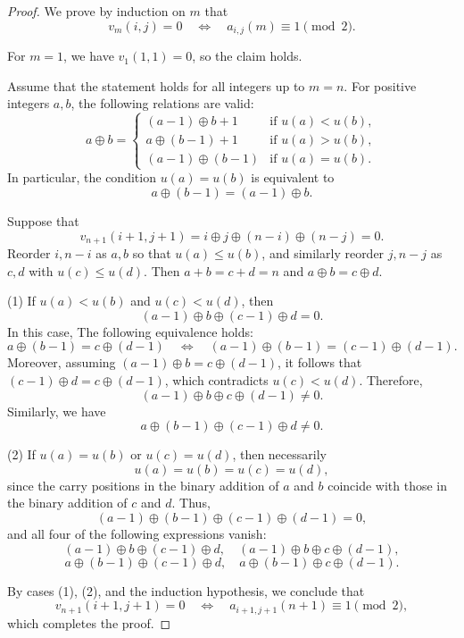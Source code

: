 \documentclass[10pt,a4paper]{amsart}
\begin{document}
\begin{proof}
We prove by induction on $m$ that
\[
v_m(i,j) = 0
\quad \Longleftrightarrow \quad
a_{i,j}(m) \equiv 1 \pmod{2}.
\]

For $m=1$, we have $v_1(1,1)=0$, so the claim holds.

Assume that the statement holds for all integers up to $m=n$.
For positive integers $a,b$, the following relations are valid:
\[
a \oplus b =
\begin{cases}
(a-1)\oplus b + 1 & \text{if } u(a) < u(b), \\
a \oplus (b-1) + 1 & \text{if } u(a) > u(b), \\
(a-1)\oplus (b-1) & \text{if } u(a) = u(b).
\end{cases}
\]
In particular, the condition $u(a)=u(b)$ is equivalent to
\[
a \oplus (b-1) = (a-1)\oplus b.
\]

Suppose that
\[
v_{n+1}(i+1,j+1)
= i \oplus j \oplus (n-i) \oplus (n-j) = 0.
\]
Reorder $i,n-i$ as $a,b$ so that $u(a) \le u(b)$, and similarly reorder $j,n-j$ as $c,d$ with $u(c) \le u(d)$.
Then $a+b=c+d=n$ and $a\oplus b=c\oplus d$.

\medskip
\noindent
(1) If \(u(a) < u(b)\) and \(u(c) < u(d)\), then
\[
(a-1)\oplus b \oplus (c-1)\oplus d = 0.
\]
In this case, The following equivalence holds:
\[
a\oplus(b-1)=c\oplus(d-1)
\quad \Longleftrightarrow \quad
(a-1)\oplus(b-1)=(c-1)\oplus(d-1).
\]
Moreover, assuming \((a-1) \oplus b = c \oplus (d-1)\), it follows that
\((c-1) \oplus d = c \oplus (d-1)\), which contradicts \(u(c) < u(d)\).
Therefore,
\[
(a-1) \oplus b \oplus c \oplus (d-1) \neq 0.
\]
Similarly, we have
\[
a \oplus (b-1) \oplus (c-1) \oplus d \neq 0.
\]


\medskip
\noindent
(2) If $u(a)=u(b)$ or $u(c)=u(d)$, then necessarily
\[
u(a)=u(b)=u(c)=u(d),
\]
since the carry positions in the binary addition of $a$ and $b$ coincide with those in the binary addition of $c$ and $d$.
Thus,
\[
(a-1)\oplus(b-1)\oplus(c-1)\oplus(d-1)=0,
\]
and all four of the following expressions vanish:
\[
(a-1)\oplus b \oplus (c-1)\oplus d,
\quad
(a-1)\oplus b \oplus c \oplus (d-1),
\]
\[
a\oplus(b-1)\oplus(c-1)\oplus d,
\quad
a\oplus(b-1)\oplus c \oplus (d-1).
\]

By cases (1), (2), and the induction hypothesis, we conclude that
\[
v_{n+1}(i+1,j+1)=0
\quad \Longleftrightarrow \quad
a_{i+1,j+1}(n+1) \equiv 1 \pmod{2},
\]
which completes the proof.
\end{proof}
\end{document}
